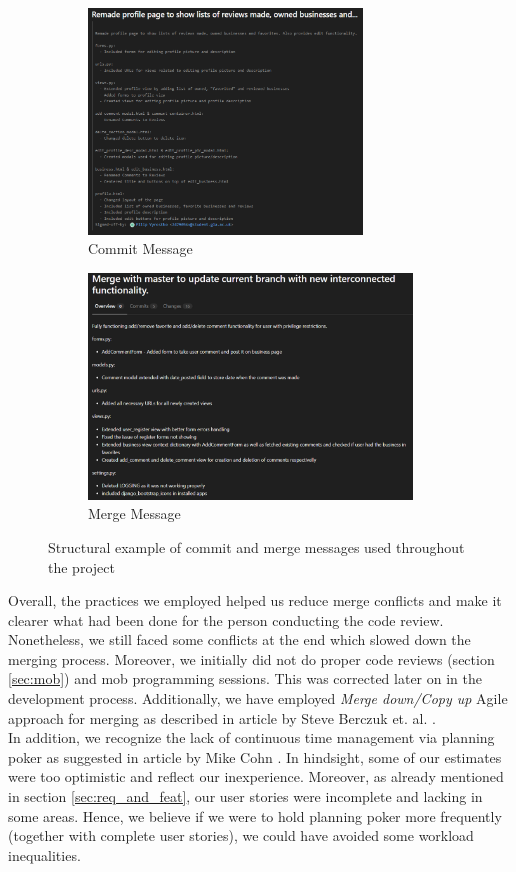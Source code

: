 \documentclass{l3proj}
\begin{document}
        \begin{figure}[H]
            \begin{subfigure}{0.5\textwidth}
                \includegraphics[width=0.9\linewidth, height=6cm]{images/CommitSnippet.PNG}
                \caption{Commit Message}
                \label{fig:commit_msg}
            \end{subfigure}
            \begin{subfigure}{0.5\textwidth}
                \includegraphics[width=0.9\linewidth, height=6cm]{images/MergerSnippet.PNG}
                \caption{Merge Message}
                \label{fig:merge_msg}
            \end{subfigure}
            
            \caption{Structural example of commit and merge messages used throughout the project}
            \label{fig:image2}
        \end{figure}
        Overall, the practices we employed helped us reduce merge conflicts and make it clearer what had been done for the person conducting the code review. Nonetheless, we still faced some conflicts at the end which slowed down the merging process. Moreover, we initially did not do proper code reviews (section \ref{sec:mob}) and mob programming sessions. This was corrected later on in the development process. Additionally, we have employed \textit{Merge down/Copy up} Agile approach for merging as described in article by Steve Berczuk et. al. \cite{merge}.\\
        In addition, we recognize the lack of continuous time management via planning poker as suggested in article by Mike Cohn \cite{continuous_poker}. In hindsight, some of our estimates were too optimistic and reflect our inexperience. Moreover, as already mentioned in section \ref{sec:req_and_feat}, our user stories were incomplete and lacking in some areas. Hence, we believe if we were to hold planning poker more frequently (together with complete user stories), we could have avoided some workload inequalities.
        
\end{document}

